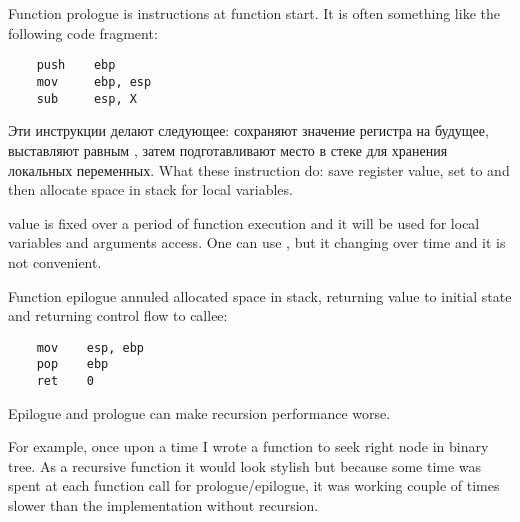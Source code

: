 ﻿\section{}
\label{sec:prologepilog}

{Function prologue is instructions at function start. It is often something like the following
code fragment:}

\begin{lstlisting}
    push    ebp
    mov     ebp, esp
    sub     esp, X
\end{lstlisting}

\IFRU
{Эти инструкции делают следующее: сохраняют значение регистра \EBP на будущее, выставляют \EBP равным \ESP, 
затем подготавливают место в стеке для хранения локальных переменных.}
{What these instruction do: save \EBP register value, set \EBP to \ESP and then allocate space in stack 
for local variables.}

{\EBP value is fixed over a period of function execution and it will be used for local variables and 
arguments access. 
One can use \ESP, but it changing over time and it is not convenient.}

{Function epilogue annuled allocated space in stack, returning \EBP value to initial state 
and returning control flow to callee:}

\begin{lstlisting}
    mov    esp, ebp
    pop    ebp
    ret    0
\end{lstlisting}

\index{\Recursion}
{Epilogue and prologue can make recursion performance worse.

For example, once upon a time I wrote a function to seek right node in binary tree. 
As a recursive function it would look stylish but because some time was spent at each function call
for prologue/epilogue, it was working couple of times slower than the implementation 
without recursion.}

